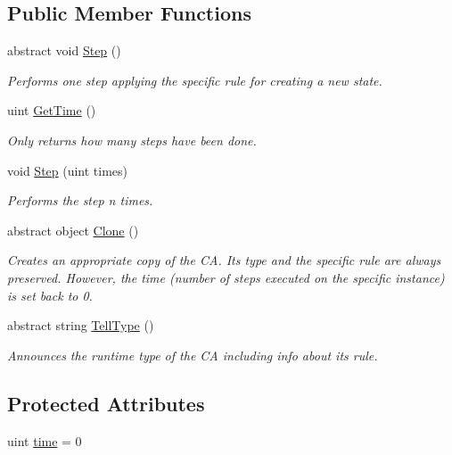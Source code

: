 \subsection*{Public Member Functions}
\begin{DoxyCompactItemize}
\item 
abstract void \hyperlink{class_cellular_1_1_cellular_automaton_aa70848d58015575974bc875ac5a89ae7}{Step} ()
\begin{DoxyCompactList}\small\item\em Performs one step applying the specific rule for creating a new state. \end{DoxyCompactList}\item 
uint \hyperlink{class_cellular_1_1_cellular_automaton_a340d1faea1300db9183b4b4368d4f838}{Get\+Time} ()
\begin{DoxyCompactList}\small\item\em Only returns how many steps have been done. \end{DoxyCompactList}\item 
void \hyperlink{class_cellular_1_1_cellular_automaton_ad4948be8db73c5e052e2c5e59ac85ad8}{Step} (uint times)
\begin{DoxyCompactList}\small\item\em Performs the step n times. \end{DoxyCompactList}\item 
abstract object \hyperlink{class_cellular_1_1_cellular_automaton_affd487b397cdbbbb1982815bbcd8e7d3}{Clone} ()
\begin{DoxyCompactList}\small\item\em Creates an appropriate copy of the C\+A. Its type and the specific rule are always preserved. However, the time (number of steps executed on the specific instance) is set back to 0. \end{DoxyCompactList}\item 
abstract string \hyperlink{class_cellular_1_1_cellular_automaton_abe4b92fd405530c8a08cc07a3a19fff4}{Tell\+Type} ()
\begin{DoxyCompactList}\small\item\em Announces the runtime type of the C\+A including info about its rule. \end{DoxyCompactList}\end{DoxyCompactItemize}
\subsection*{Protected Attributes}
\begin{DoxyCompactItemize}
\item 
uint \hyperlink{class_cellular_1_1_cellular_automaton_a6eaa8a9840fbc4c875d4e7d5a14e5f70}{time} = 0
\end{DoxyCompactItemize}


